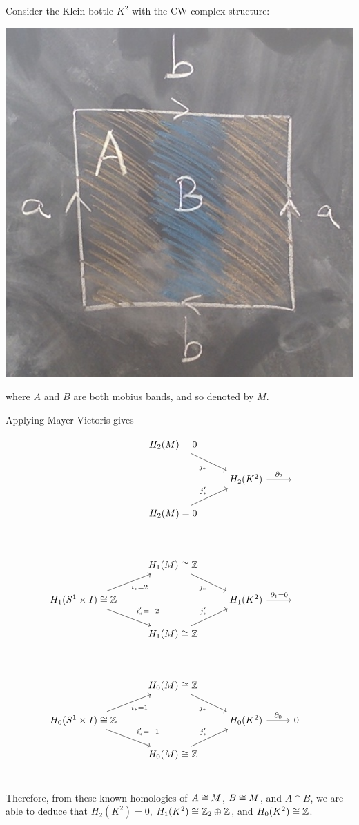 \documentclass[11pt,leqno,oneside]{amsart}
\numberwithin{thm}{section}
\renewcommand{\d}{\partial}
\newcommand{\homl}[1][n]{H_{#1}}
\newcommand{\x}{\times}
\begin{document}
\begin{example}
  Consider the Klein bottle $K^2$ with the CW-complex structure:

  \includegraphics[scale=0.15]{images/klein-cw-mayer-vietoris}

  where $A$ and $B$ are both mobius bands, and so denoted by $M$.

  Applying Mayer-Vietoris gives

  $$\begin{tikzcd}
    & & \homl[2](M) = 0 \arrow[rd, "j_*"'] \\
    & & &\homl[2](K^2) \arrow[r, "\d_2"] &\,\\
    & &\homl[2](M) = 0 \arrow[ru, "j'_*"] \\
    \\
    & & \homl[1](M) \isom \Z \arrow[rd, "j_*"'] \\
    &\homl[1](S^1 \x I) \isom \Z \arrow[ru, "i_* = 2"'] \arrow[rd, "-i'_* = -2"] & &\homl[1](K^2) \arrow[r, "\d_1 = 0"] &\,\\
    & &\homl[1](M) \isom \Z \arrow[ru, "j'_*"] \\
    \\
    & & \homl[0](M) \isom \Z \arrow[rd, "j_*"'] \\
    &\homl[0](S^1 \x I) \isom \Z \arrow[ru, "i_* = 1"'] \arrow[rd, "-i'_* = -1"] & &\homl[0](K^2) \arrow[r, "\d_0"] &0 &\,\\
    & &\homl[0](M) \isom \Z \arrow[ru, "j'_*"] \\
  \end{tikzcd}$$

  Therefore, from these known homologies of $A \mathrel{\cong} M$, $B \mathrel{\cong} M$, and $A \cap B$, we are able to deduce that $H_2(K^2) = 0$, $H_1(K^2) \mathrel{\cong} {\mathbb Z}_2 \oplus {\mathbb Z}$, and $H_0(K^2) \mathrel{\cong} {\mathbb Z}$.
\end{example}
\end{document}
